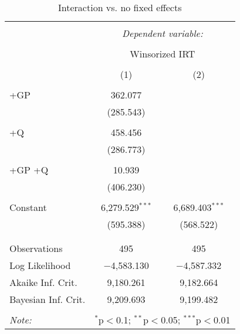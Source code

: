 \documentclass[]{tufte-handout}
\begin{document}
\begin{table}[!htbp] \centering 
  \caption{Interaction vs. no fixed effects} 
  \label{} 
\begin{tabular}{@{\extracolsep{5pt}}lcc} 
\\[-1.8ex]\hline 
\hline \\[-1.8ex] 
 & \multicolumn{2}{c}{\textit{Dependent variable:}} \\ 
\cline{2-3} 
\\[-1.8ex] & \multicolumn{2}{c}{Winsorized IRT} \\ 
\\[-1.8ex] & (1) & (2)\\ 
\hline \\[-1.8ex] 
 +GP & 362.077 &  \\ 
  & (285.543) &  \\ 
  & & \\ 
 +Q & 458.456 &  \\ 
  & (286.773) &  \\ 
  & & \\ 
 +GP +Q & 10.939 &  \\ 
  & (406.230) &  \\ 
  & & \\ 
 Constant & 6,279.529$^{***}$ & 6,689.403$^{***}$ \\ 
  & (595.388) & (568.522) \\ 
  & & \\ 
\hline \\[-1.8ex] 
Observations & 495 & 495 \\ 
Log Likelihood & $-$4,583.130 & $-$4,587.332 \\ 
Akaike Inf. Crit. & 9,180.261 & 9,182.664 \\ 
Bayesian Inf. Crit. & 9,209.693 & 9,199.482 \\ 
\hline 
\hline \\[-1.8ex] 
\textit{Note:}  & \multicolumn{2}{r}{$^{*}$p$<$0.1; $^{**}$p$<$0.05; $^{***}$p$<$0.01} \\ 
\end{tabular} 
\end{table}
\end{document}
